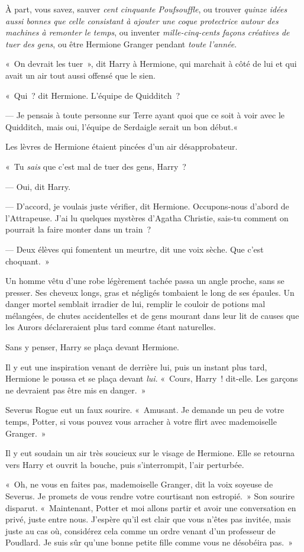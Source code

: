 À part, vous savez, sauver \emph{cent cinquante Poufsouffle}, ou trouver \emph{quinze idées aussi bonnes que celle consistant à ajouter une coque protectrice autour des machines à remonter le temps}, ou inventer \emph{mille-cinq-cents façons créatives de tuer des gens}, ou être Hermione Granger pendant \emph{toute l'année}.

«~On devrait les tuer~», dit Harry à Hermione, qui marchait à côté de lui et qui avait un air tout aussi offensé que le sien.

«~Qui~? dit Hermione.
L'équipe de Quidditch~?

--- Je pensais à toute personne sur Terre ayant quoi que ce soit à voir avec le Quidditch, mais oui, l'équipe de Serdaigle serait un bon début.«~

Les lèvres de Hermione étaient pincées d'un air désapprobateur.

«~Tu \emph{sais} que c'est mal de tuer des gens, Harry~?

--- Oui, dit Harry.

--- D'accord, je voulais juste vérifier, dit Hermione.
Occupons-nous d'abord de l'Attrapeuse.
J'ai lu quelques mystères d'Agatha Christie, sais-tu comment on pourrait la faire monter dans un train~?

--- Deux élèves qui fomentent un meurtre, dit une voix sèche.
Que c'est choquant.~»

Un homme vêtu d’une robe légèrement tachée passa un angle proche, sans se presser.
Ses cheveux longs, gras et négligés tombaient le long de ses épaules.
Un danger mortel semblait irradier de lui, remplir le couloir de potions mal mélangées, de chutes accidentelles et de gens mourant dans leur lit de causes que les Aurors déclareraient plus tard comme étant naturelles.

Sans y penser, Harry se plaça devant Hermione.

Il y eut une inspiration venant de derrière lui, puis un instant plus tard, Hermione le poussa et se plaça devant \emph{lui}.
«~Cours, Harry~! dit-elle.
Les garçons ne devraient pas être mis en danger.~»

Severus Rogue eut un faux sourire.
«~Amusant.
Je demande un peu de votre temps, Potter, si vous pouvez vous arracher à votre flirt avec mademoiselle Granger.~»

Il y eut soudain un air très soucieux sur le visage de Hermione.
Elle se retourna vers Harry et ouvrit la bouche, puis s'interrompit, l'air perturbée.

«~Oh, ne vous en faites pas, mademoiselle Granger, dit la voix soyeuse de Severus.
Je promets de vous rendre votre courtisant non estropié.~»
Son sourire disparut.
«~Maintenant, Potter et moi allons partir et avoir une conversation en privé, juste entre nous.
J'espère qu'il est clair que vous n'êtes pas invitée, mais juste au cas où, considérez cela comme un ordre venant d'un professeur de Poudlard.
Je suis sûr qu'une bonne petite fille comme vous ne désobéira pas.~»

